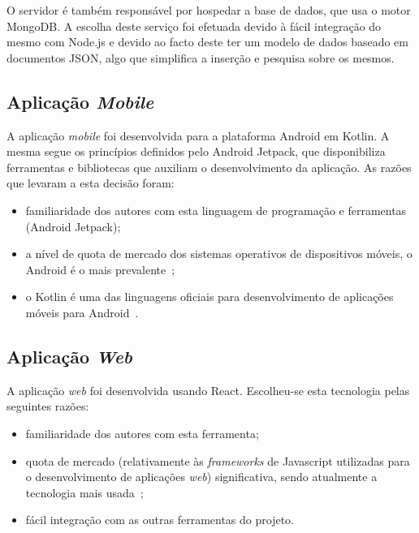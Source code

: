 O servidor é também responsável por hospedar a base de dados, que usa o motor MongoDB. A escolha deste serviço foi efetuada devido à fácil integração do mesmo com Node.js e devido ao facto deste ter um modelo de dados baseado em documentos JSON, algo que simplifica a inserção e pesquisa sobre os mesmos.

\subsection{Aplicação \textit{Mobile}}
A aplicação \textit{mobile} foi desenvolvida para a plataforma Android em Kotlin. A mesma segue os princípios definidos pelo Android Jetpack, que disponibiliza ferramentas e bibliotecas que auxiliam o desenvolvimento da aplicação. As razões que levaram a esta decisão foram:
\begin{itemize}
	\item familiaridade dos autores com esta linguagem de programação e ferramentas (Android Jetpack);
	\item a nível de quota de mercado dos sistemas operativos de dispositivos móveis, o Android é o mais prevalente~\cite{SCGS2020};
	\item o Kotlin é uma das linguagens oficiais para desenvolvimento de aplicações móveis para Android~\cite{Leiva2017}.
\end{itemize}

\subsection{Aplicação \textit{Web}}
A aplicação \textit{web} foi desenvolvida usando React. Escolheu-se esta tecnologia pelas seguintes razões:

\begin{itemize}
	\item familiaridade dos autores com esta ferramenta;
	\item quota de mercado (relativamente às \textit{frameworks} de Javascript utilizadas para o desenvolvimento de aplicações \textit{web}) significativa, sendo atualmente a tecnologia mais usada~\cite{TechMagic2020};
	\item fácil integração com as outras ferramentas do projeto.
\end{itemize}

\newpage

